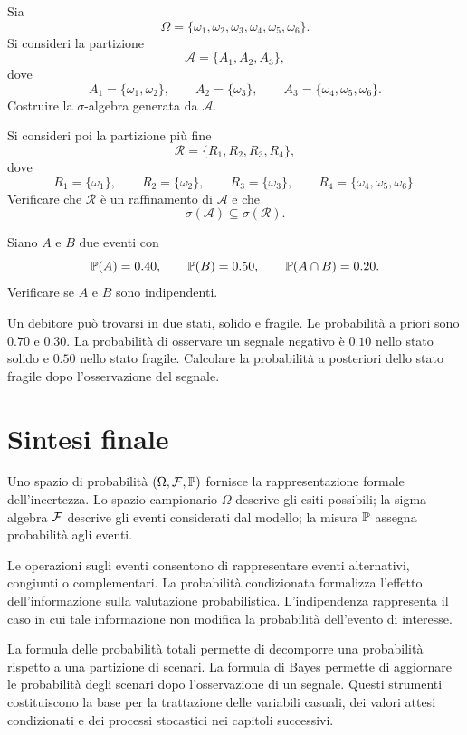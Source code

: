 \begin{exercise}
\label{ex:cap1-prop-sigma-partizione}
Sia
\[
\Omega=\{\omega_1,\omega_2,\omega_3,\omega_4,\omega_5,\omega_6\}.
\]
Si consideri la partizione
\[
\mathcal{A}
=
\big\{
A_1,A_2,A_3
\big\},
\]
dove
\[
A_1=\{\omega_1,\omega_2\},\qquad
A_2=\{\omega_3\},\qquad
A_3=\{\omega_4,\omega_5,\omega_6\}.
\]
Costruire la $\sigma$-algebra generata da $\mathcal{A}$.

Si consideri poi la partizione pi\`{u} fine
\[
\mathcal{R}
=
\big\{
R_1,R_2,R_3,R_4
\big\},
\]
dove
\[
R_1=\{\omega_1\},\qquad
R_2=\{\omega_2\},\qquad
R_3=\{\omega_3\},\qquad
R_4=\{\omega_4,\omega_5,\omega_6\}.
\]
Verificare che $\mathcal{R}$ \`{e} un raffinamento di $\mathcal{A}$ e che
\[
\sigma(\mathcal{A})\subseteq\sigma(\mathcal{R}).
\]
\end{exercise}

\begin{exercise}
\label{ex:cap1-prop-indipendenza}
Siano $A$ e $B$ due eventi con
\[
\mathbb{P}(A)=0.40,\qquad\mathbb{P}(B)=0.50,\qquad\mathbb{P}(A\cap B)=0.20.
\]
Verificare se $A$ e $B$ sono indipendenti.
\end{exercise}

\begin{exercise}
\label{ex:cap1-prop-bayes-stato-fragile}
Un debitore pu\`{o} trovarsi in due stati, solido e fragile. Le
probabilit\`{a} a priori sono $0.70$ e $0.30$. La probabilit\`{a} di osservare
un segnale negativo \`{e} $0.10$ nello stato solido e $0.50$ nello stato
fragile. Calcolare la probabilit\`{a} a posteriori dello stato fragile dopo
l'osservazione del segnale.
\end{exercise}

\section{Sintesi finale}

Uno spazio di probabilit\`{a} $(\Omega,\mathcal{F},\mathbb{P})$ fornisce la
rappresentazione formale dell'incertezza. Lo spazio campionario $\Omega$
descrive gli esiti possibili; la sigma-algebra $\mathcal{F}$ descrive gli
eventi considerati dal modello; la misura $\mathbb{P}$ assegna probabilit\`{a}
agli eventi.

Le operazioni sugli eventi consentono di rappresentare eventi alternativi,
congiunti o complementari. La probabilit\`{a} condizionata formalizza
l'effetto dell'informazione sulla valutazione probabilistica. L'indipendenza
rappresenta il caso in cui tale informazione non modifica la probabilit\`{a}
dell'evento di interesse.

La formula delle probabilit\`{a} totali permette di decomporre una
probabilit\`{a} rispetto a una partizione di scenari. La formula di Bayes
permette di aggiornare le probabilit\`{a} degli scenari dopo l'osservazione di
un segnale. Questi strumenti costituiscono la base per la trattazione delle
variabili casuali, dei valori attesi condizionati e dei processi stocastici
nei capitoli successivi.

